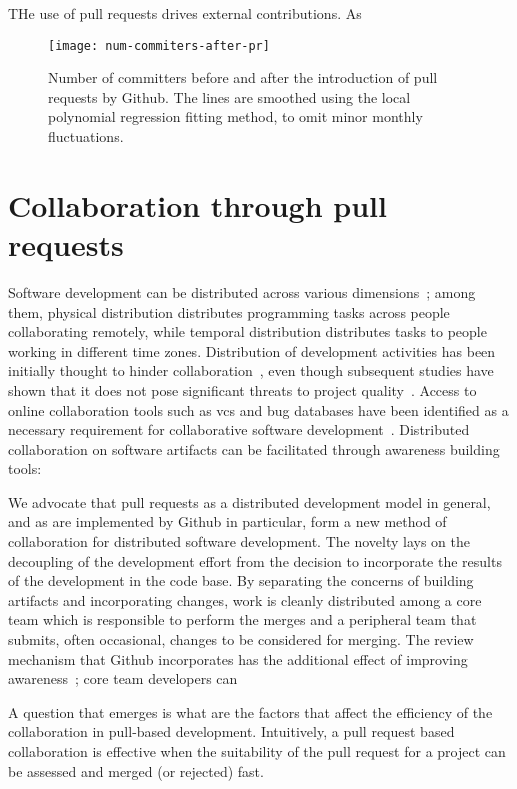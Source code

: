 \documentclass{sig-alternate}
\begin{document}
THe use of pull requests drives external contributions. As 

\begin{figure}
  \begin{center}
    \texttt{[image: num-commiters-after-pr]}
  \end{center}
  \caption{Number of committers before and after the introduction of pull
  requests by Github. The lines are smoothed using the local polynomial
  regression fitting method, to omit minor monthly fluctuations.}
  \label{fig:}
\end{figure}

\section{Collaboration through pull requests}

Software development can be distributed across various dimensions~\cite{Gumm06};
among them, physical distribution distributes programming tasks across people
collaborating remotely, while temporal distribution distributes tasks to people
working in different time zones. Distribution of development activities has been
initially thought to hinder collaboration~\cite{Herbs99, Batti01}, even though
subsequent studies have shown that it does not pose significant threats to
project quality~\cite{Spine06, Nguye08, Bird09a}. Access to online collaboration
tools such as {\sc vcs} and bug databases have been identified as a necessary
requirement for collaborative software development~\cite{Knuds76,Pilat06,
Catal06}. Distributed collaboration on software artifacts can be facilitated
through awareness building tools: 

We advocate that pull requests as a distributed development model in general,
and as are implemented by Github in particular, form a new method of
collaboration for distributed software development. The novelty lays on
the decoupling of the development effort from the decision to incorporate
the results of the development in the code base. 
By separating the concerns of building artifacts and incorporating
changes, work is cleanly distributed among a core team which is responsible
to perform the merges and a peripheral team that submits, often occasional,
changes to be considered for merging. 
The review mechanism that Github incorporates has the additional effect of
improving awareness~\cite{Dabbi12}; core team developers can 

A question that emerges is what are the factors that affect the efficiency
of the collaboration in pull-based development. Intuitively, a pull request
based collaboration is effective when the suitability of the pull request for
a project can be assessed and merged (or rejected) fast. 
\end{document}
